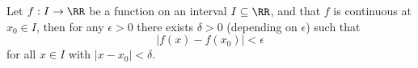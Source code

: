 

\begin{theorem}
Let $f:I\to\RR$ be a function on an interval $I\subseteq \RR$, 
and that $f$ is continuous at $x_0\in I$, then for any $\epsilon>0$ 
there exists $\delta>0$ (depending on $\epsilon$) such that 
$$
|f(x)-f(x_0)| < \epsilon
$$
for all $x\in I$ with $|x-x_0|<\delta$.
\end{theorem}

